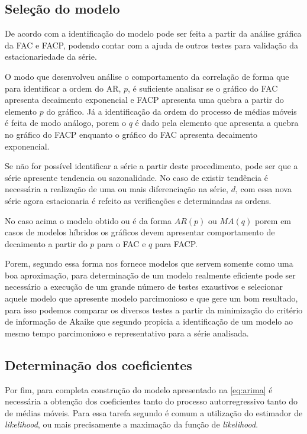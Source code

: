 \documentclass[
    12pt,
    oneside,
    a4paper,
    english,
    brazil
]{abntex2}
\begin{document}
\subsection{Seleção do modelo}

De  acordo com   a  identificação do  modelo pode  ser feita  a
partir da análise gráfica  da FAC e FACP, podendo contar com  a ajuda de outros
testes para validação da estacionariedade da série.

O modo que   desenvolveu análise o  comportamento da correlação
de forma que  para identificar a ordem  do AR, $p$, é suficiente  analisar se o
gráfico do FAC  apresenta decaimento exponencial e FACP apresenta  uma quebra a
partir do elemento $p$  do gráfico. Já a identificação da  ordem do processo de
médias móveis  é feita de modo  análogo, porem o  $q$ é dado pela  elemento que
apresenta  a quebra  no gráfico  do FACP  enquanto o  gráfico do  FAC apresenta
decaimento exponencial.

Se não for  possível identificar a série a partir  deste procedimento, pode ser
que a série apresente tendencia ou sazonalidade. No caso de existir tendência é
necessária a  realização de uma ou  mais diferenciação na série,  $d$, com essa
nova  série agora  estacionaria é  refeito  as verificações  e determinadas  as
ordens.

No caso acima o  modelo obtido ou é da forma $AR(p)$ ou  $MA(q)$ porem em casos
de modelos híbridos os gráficos  devem apresentar comportamento de decaimento a
partir do $p$ para o FAC e $q$ para FACP\@.

Porem, segundo   essa  forma nos  fornece modelos  que servem
somente  como uma  boa aproximação,  para determinação  de um  modelo realmente
eficiente  pode  ser necessário  a  execução  de  um  grande número  de  testes
exaustivos e selecionar  aquele modelo que apresente modelo  parcimonioso e que
gere  um  bom resultado,  para  isso  podemos  comparar  os diversos  testes  a
partir  da  minimização  do  critério  de  informação  de  Akaike  que  segundo
  propicia  a identificação  de  um  modelo ao  mesmo  tempo
parcimonioso e representativo para a série analisada.

\subsection{Determinação dos coeficientes}

Por fim, para completa construção do modelo apresentado na \autoref{eq:arima} é
necessária  a  obtenção  dos  coeficientes tanto  do  processo  autorregressivo
tanto  do de  médias móveis.  Para essa  tarefa segundo  é
comum a utilização do estimador de \textit{likelihood}, ou mais precisamente a
maximação da função de \textit{likelihood}.
\end{document}
